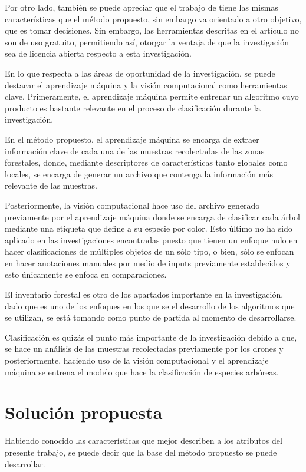 Por otro lado, también se puede apreciar que el trabajo de \citet{rf10} tiene las mismas características que el método propuesto, sin embargo va orientado a otro objetivo, que es tomar decisiones. Sin embargo, las herramientas descritas en el artículo no son de uso gratuito, permitiendo así, otorgar la ventaja de que la investigación sea de licencia abierta respecto a esta investigación.

En lo que respecta a las áreas de oportunidad de la investigación, se puede destacar el aprendizaje máquina y la visión computacional como herramientas clave. Primeramente, el aprendizaje máquina permite entrenar un algoritmo cuyo producto es bastante relevante en el proceso de clasificación durante la investigación.

En el método propuesto, el aprendizaje máquina se encarga de extraer información clave de cada una de las muestras recolectadas de las zonas forestales, donde, mediante descriptores de características tanto globales como locales, se encarga de generar un archivo que contenga la información más relevante de las muestras.

Posteriormente, la visión computacional hace uso del archivo generado previamente por el aprendizaje máquina donde se encarga de clasificar cada árbol mediante una etiqueta que define a su especie por color. Esto último no ha sido aplicado en las investigaciones encontradas puesto que tienen un enfoque nulo en hacer clasificaciones de múltiples objetos de un sólo tipo, o bien, sólo se enfocan en hacer anotaciones manuales por medio de inputs previamente establecidos y esto únicamente se enfoca en comparaciones.

El inventario forestal es otro de los apartados importante en la investigación, dado que es uno de los enfoques en los que se el desarrollo de los algoritmos que se utilizan, se está tomando como punto de partida al momento de desarrollarse. 

Clasificación es quizás el punto más importante de la investigación debido a que, se hace un análisis de las muestras recolectadas previamente por los drones y posteriormente, haciendo uso de la visión computacional y el aprendizaje máquina se entrena el modelo que hace la clasificación de especies arbóreas.


\chapter{Solución propuesta}
Habiendo conocido las características que mejor describen a los atributos del presente trabajo, se puede decir que la base del método propuesto se puede desarrollar.

